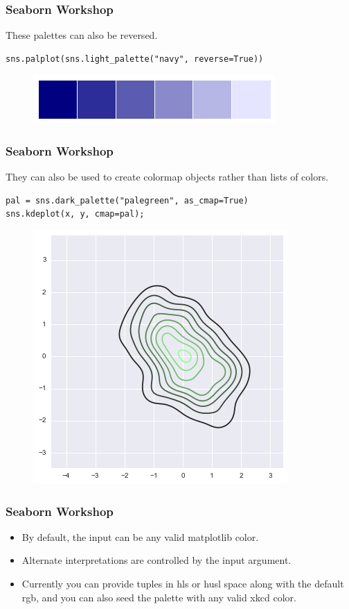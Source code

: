 \documentclass{beamer}
\begin{document}
\begin{frame}[fragile]
	\frametitle{Seaborn Workshop}
	\large
These palettes can also be reversed.
\begin{verbatim}
sns.palplot(sns.light_palette("navy", reverse=True))
\end{verbatim}
\begin{figure}
\centering
\includegraphics[width=0.7\linewidth]{images/color_palettes_46_0}
\caption{}
\label{fig:color_palettes_46_0}
\end{figure}


\end{frame}
\begin{frame}[fragile]
\frametitle{Seaborn Workshop}
\large

They can also be used to create colormap objects rather than lists of colors.
\begin{verbatim}
pal = sns.dark_palette("palegreen", as_cmap=True)
sns.kdeplot(x, y, cmap=pal);
\end{verbatim}

\begin{figure}
\centering
\includegraphics[width=0.7\linewidth]{images/color_palettes_48_0}
\caption{}
\label{fig:color_palettes_48_0}
\end{figure}
\end{frame}
\begin{frame}[fragile]
	\frametitle{Seaborn Workshop}
	\large
\begin{itemize}
	\item
By default, the input can be any valid matplotlib color. 
\item Alternate interpretations are controlled by the input argument.
\item  Currently you can provide tuples in hls or husl space along with the default rgb, and you can also seed the palette with any valid xkcd color.
\end{itemize}
\end{frame}
\end{document}

